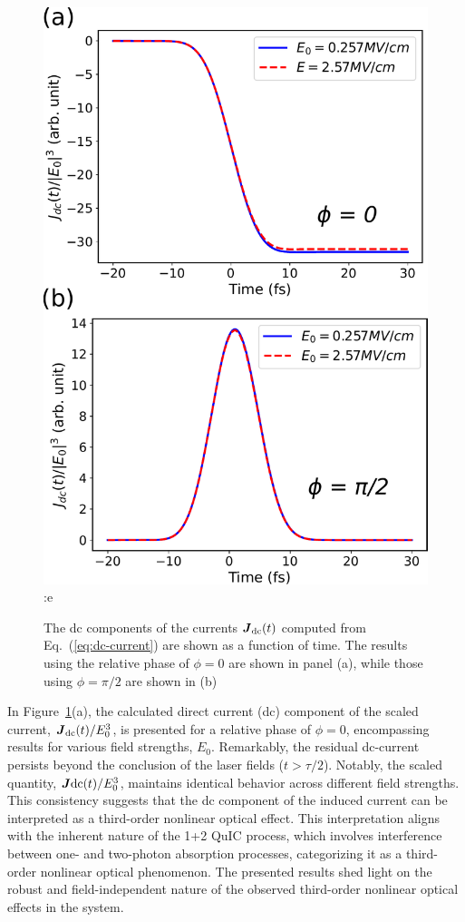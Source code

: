 \begin{figure}[htbp]
\centering
 \includegraphics[width=0.8\linewidth]{pic/dc_current.pdf}:e
\caption{\label{fig:dc_current} 
The dc components of the currents $\boldsymbol{J}_{\text{dc}}(t)$ computed from Eq.~(\ref{eq:dc-current}) are shown as a function of time. The results using the relative phase of $\phi=0$ are shown in panel (a), while those using $\phi=\pi/2$ are shown in (b) }
\end{figure}

In Figure~\ref{fig:dc_current}(a), the calculated direct current (dc) component of the scaled current, $\boldsymbol{J}_{\text{dc}}(t)/E_0^3$, is presented for a relative phase of $\phi=0$, encompassing results for various field strengths, $E_0$. Remarkably, the residual dc-current persists beyond the conclusion of the laser fields ($t>\tau/2$). Notably, the scaled quantity, $\boldsymbol{J}{\text{dc}}(t)/E_0^3$, maintains identical behavior across different field strengths. This consistency suggests that the dc component of the induced current can be interpreted as a third-order nonlinear optical effect. This interpretation aligns with the inherent nature of the 1+2 \gls{QuIC} process, which involves interference between one- and two-photon absorption processes, categorizing it as a third-order nonlinear optical phenomenon. The presented results shed light on the robust and field-independent nature of the observed third-order nonlinear optical effects in the system.

